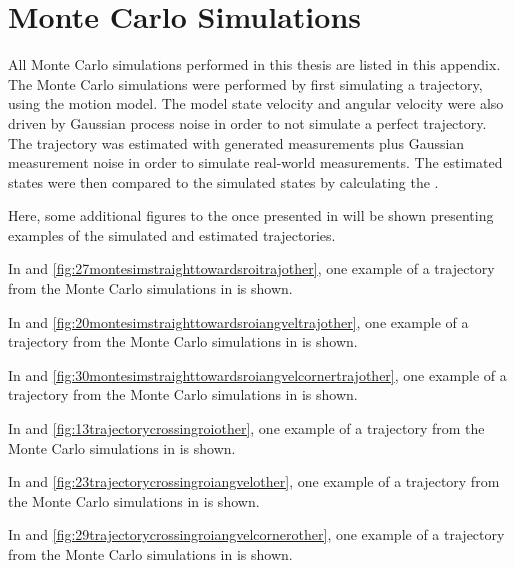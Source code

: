 \chapter{Monte Carlo Simulations}
\label{app:montecarlo}

All Monte Carlo simulations performed in this thesis are listed in this appendix.
The Monte Carlo simulations were performed by first simulating a trajectory, using the motion model.
The model state velocity and angular velocity were also driven by Gaussian process noise in order to not simulate a perfect trajectory.
The trajectory was estimated with generated measurements plus Gaussian measurement noise in order to simulate real-world measurements.
The estimated states were then compared to the simulated states by calculating the \abbrRMSE.

Here, some additional figures to the once presented in  will be shown presenting examples of the simulated and estimated trajectories.

In  and \ref{fig:27montesimstraighttowardsroitrajother}, one example of a trajectory from the Monte Carlo simulations in  is shown.

In  and \ref{fig:20montesimstraighttowardsroiangveltrajother}, one example of a trajectory from the Monte Carlo simulations in  is shown.

In  and \ref{fig:30montesimstraighttowardsroiangvelcornertrajother}, one example of a trajectory from the Monte Carlo simulations in  is shown.

In  and \ref{fig:13trajectorycrossingroiother}, one example of a trajectory from the Monte Carlo simulations in  is shown.

In  and \ref{fig:23trajectorycrossingroiangvelother}, one example of a trajectory from the Monte Carlo simulations in  is shown.

In  and \ref{fig:29trajectorycrossingroiangvelcornerother}, one example of a trajectory from the Monte Carlo simulations in  is shown.

